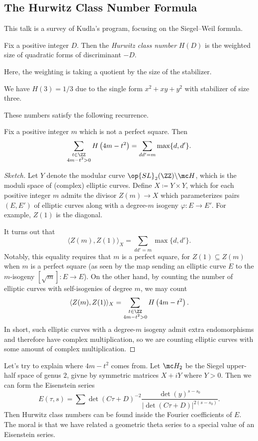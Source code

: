 \documentclass{article}
\begin{document}
\subsection{The Hurwitz Class Number Formula}
This talk is a survey of Kudla's program, focusing on the Siegel--Weil formula.
\begin{definition}
	Fix a positive integer $D$. Then the \textit{Hurwitz class number} $H(D)$ is the weighted size of quadratic forms of discriminant $-D$.
\end{definition}
Here, the weighting is taking a quotient by the size of the stabilizer.
\begin{example}
	We have $H(3)=1/3$ due to the single form $x^2+xy+y^2$ with stabilizer of size three.
\end{example}
These numbers satisfy the following recurrence.
\begin{theorem}[Hurwitz]
	Fix a positive integer $m$ which is not a perfect square. Then
	\[\sum_{\substack{t\in\ZZ\\4m-t^2>0}}H\left(4m-t^2\right)=\sum_{dd'=m}\max\{d,d'\}.\]
\end{theorem}
\begin{proof}[Sketch]
	Let $Y$ denote the modular curve $\op{SL}_2(\ZZ)\backslash\mc H$, which is the moduli space of (complex) elliptic curves. Define $X\coloneqq Y\times Y$, which for each positive integer $m$ admits the divisor $Z(m)\to X$ which parameterizes pairs $(E,E')$ of elliptic curves along with a degree-$m$ isogeny $\varphi\colon E\to E'$. For example, $Z(1)$ is the diagonal.

	It turns out that
	\[\langle Z(m),Z(1)\rangle_X=\sum_{dd'=m}\max\{d,d'\}.\]
	Notably, this equality requires that $m$ is a perfect square, for $Z(1)\subseteq Z(m)$ when $m$ is a perfect square (as seen by the map sending an elliptic curve $E$ to the $m$-isogeny $[\sqrt m]\colon E\to E$). On the other hand, by counting the number of elliptic curves with self-isogenies of degree $m$, we may count
	\[\langle Z(m),Z(1)\rangle_X=\sum_{\substack{t\in\ZZ\\4m-t^2>0}}H\left(4m-t^2\right).\]
	In short, such elliptic curves with a degree-$m$ isogeny admit extra endomorphisms and therefore have complex multiplication, so we are counting elliptic curves with some amount of complex multiplication.
\end{proof}
Let's try to explain where $4m-t^2$ comes from. Let $\mc H_2$ be the Siegel upper-half space of genus $2$, givne by symmetric matrices $X+iY$ where $Y>0$. Then we can form the Eisenstein series
\[E(\tau,s)=\sum\det\left(C\tau+D\right)^{-2}\frac{\det (y)^{s-s_0}}{\left|\det(C\tau+D)\right|^{2(s-s_0)}}.\]
Then Hurwitz class numbers can be found inside the Fourier coefficients of $E$. The moral is that we have related a geometric theta series to a special value of an Eisenstein series.
\end{document}
